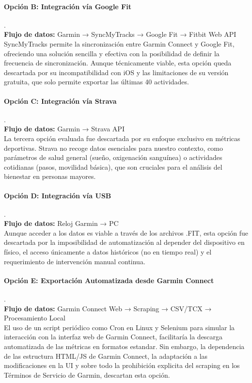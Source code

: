 \paragraph{Opción B: Integración vía Google Fit} . \\
\textbf{Flujo de datos: } Garmin → SyncMyTracks → Google Fit → Fitbit Web API \\
SyncMyTracks permite la sincronización entre Garmin Connect y Google Fit, ofreciendo una solución sencilla y efectiva con la posibilidad de definir la frecuencia de sincronización. Aunque técnicamente viable, esta opción queda descartada por su incompatibilidad con iOS y las limitaciones de su versión gratuita, que solo permite exportar las últimas 40 actividades.

\paragraph{Opción C: Integración vía Strava} . \\
\textbf{Flujo de datos: } Garmin → Strava API \\
La tercera opción evaluada fue descartada por su enfoque exclusivo en métricas deportivas. Strava no recoge datos esenciales para nuestro contexto, como parámetros de salud general (sueño, oxigenación sanguínea) o actividades cotidianas (pasos, movilidad básica), que son cruciales para el análisis del bienestar en personas mayores. 
\paragraph{Opción D: Integración vía USB} . \\
\textbf{Flujo de datos: } Reloj Garmin → PC \\
Aunque acceder a los datos es viable a través de los archivos .FIT, esta opción fue descartada por la imposibilidad de automatización al depender del dispositivo en físico, el acceso únicamente a datos históricos (no en tiempo real) y el requerimiento de intervención manual continua. 
\paragraph{Opción E: Exportación Automatizada desde Garmin Connect} . \\
\textbf{Flujo de datos: } Garmin Connect Web → Scraping → CSV/TCX → Procesamiento Local \\
El uso de un script periódico como Cron en Linux y Selenium para simular la interacción con la interfaz web de Garmin Connect, facilitaría la descarga automatizada de las métricas en formatos estandar. Sin embargo, la dependencia de las estructura HTML/JS de Garmin Connect, la adaptación a las modificaciones en la UI y sobre todo la prohibición explicita del scraping en los Términos de Servicio de Garmin, descartan esta opción.\\
